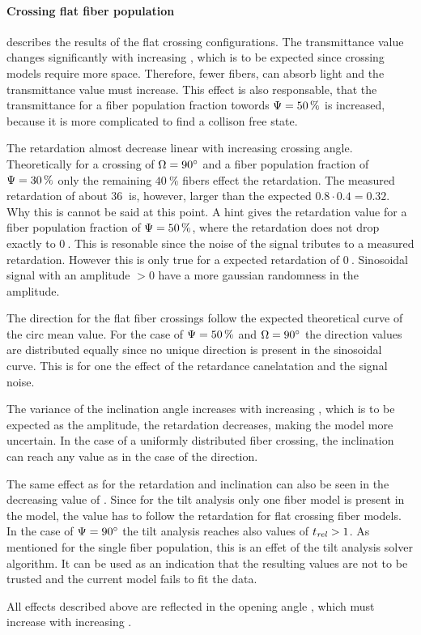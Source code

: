 \paragraph{Crossing flat fiber population}
 describes the results of the flat crossing configurations.
The transmittance value changes significantly with increasing \modelOmega{}, which is to be expected since crossing models require more space.
Therefore, fewer fibers, can absorb light and the transmittance value must increase.
This effect is also responsable, that the transmittance for a fiber population fraction towords $\textnormal{$\Psi$}=\SI{50}{\percent}$ is increased, because it is more complicated to find a collison free state.
\par
%
The retardation almost decrease linear with increasing crossing angle.
Theoretically for a crossing of $\textnormal{$\Omega$}=\SI{90}{\degree}$ and a fiber population fraction of $\textnormal{$\Psi$}=\SI{30}{\percent}$ only the remaining $\SI{40}{\percent}$ fibers effect the retardation.
The measured retardation of about $\SI{36}{}$ is, however, larger than the expected $0.8\cdot 0.4 = 0.32$.
Why this is cannot be said at this point.
A hint gives the retardation value for a fiber population fraction of $\textnormal{$\Psi$}=\SI{50}{\percent}$, where the retardation does not drop exactly to $\SI{0}{}$.
This is resonable since the noise of the signal tributes to a measured retardation.
However this is only true for a expected retardation of $\SI{0}{}$.
Sinosoidal signal with an amplitude $>0$ have a more gaussian randomness in the amplitude.
\par
%
The direction for the flat fiber crossings follow the expected theoretical curve of the circ mean value.
For the case of $\textnormal{$\Psi$}=\SI{50}{\percent}$ and $\textnormal{$\Omega$}=\SI{90}{\degree}$ the direction values are distributed equally since no unique direction is present in the sinosoidal curve.
This is for one the effect of the retardance canelatation and the signal noise.
\par
%
The variance of the inclination angle increases with increasing \modelOmega{}, which is to be expected as the amplitude, \ie{} the retardation decreases, making the model more uncertain.
In the case of a uniformly distributed fiber crossing, the inclination can reach any value as in the case of the direction.
\par
%
The same effect as for the retardation and inclination can also be seen in the decreasing value of \trel{}.
Since for the tilt analysis only one fiber model is present in the model, the \trel{} value has to follow the retardation for flat crossing fiber models.
In the case of $\textnormal{$\Psi$}=\SI{90}{\degree}$ the tilt analysis reaches also values of $\textnormal{$t_\mathit{rel}$}>1$.
As mentioned for the single fiber population, this is an effet of the tilt analysis solver algorithm.
It can be used as an indication that the resulting values are not to be trusted and the current model fails to fit the data.
\par
%
All effects described above are reflected in the opening angle \openingAngle{}, which must increase with increasing \modelOmega{} .
%
%
%
